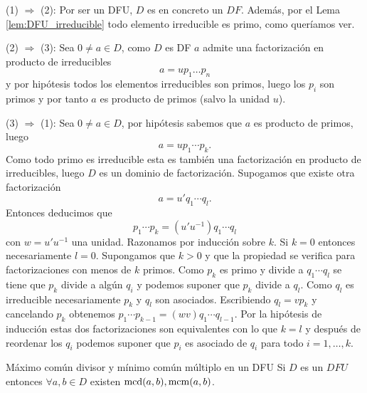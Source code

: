 \begin{proofbox}
(1) $\Rightarrow$ (2): Por ser un DFU, $D$ es en concreto un $DF$. Además, por el Lema \ref{lem:DFU_irreducible} todo elemento irreducible es primo, como queríamos ver.

(2) $\Rightarrow$ (3): Sea $0 \neq a \in D$, como $D$ es DF $a$ admite una factorización en producto de irreducibles
\[
a = u p_1 \dots p_n
\]
y por hipótesis todos los elementos irreducibles son primos, luego los $p_i$ son primos y por tanto $a$ es producto de primos (salvo la unidad $u$).

(3) $\Rightarrow$ (1): Sea $0 \neq a \in D$, por hipótesis sabemos que $a$ es producto de primos, luego
\[
a = u p_1 \cdots p_k.
\]
Como todo primo es irreducible esta es también una factorización en producto de irreducibles, luego $D$ es un dominio de factorización. Supogamos que existe otra factorización
\[
a = u' q_1 \cdots q_l.
\]
Entonces deducimos que 
\[
p_1 \cdots p_k = (u'u^{-1}) q_1 \cdots q_l
\]
con \(w = u'u^{-1}\) una unidad. Razonamos por inducción sobre \(k\). Si \(k = 0\) entonces necesariamente \(l = 0\). Supongamos que \(k > 0\) y que la propiedad se verifica para factorizaciones con menos de \(k\) primos. Como \(p_k\) es primo y divide a \(q_1 \cdots q_l\) se tiene que \(p_k\) divide a algún \(q_i\) y podemos suponer que \(p_k\) divide a \(q_l\). Como \(q_l\) es irreducible necesariamente \(p_k\) y \(q_l\) son asociados. Escribiendo \(q_l = v p_k\) y cancelando \(p_k\) obtenemos \(p_1 \cdots p_{k-1} = (wv) q_1 \cdots q_{l-1}\). Por la hipótesis de inducción estas dos factorizaciones son equivalentes con lo que \(k = l\) y después de reordenar los \(q_i\) podemos suponer que \(p_i\) es asociado de \(q_i\) para todo \(i = 1, \ldots, k\).
\end{proofbox}

\begin{theorem}{Máximo común divisor y mínimo común múltiplo en un DFU}{}
Si $D$ es un $DFU$ entonces $\forall a,b \in D$ existen $\operatorname{mcd}(a,b), \operatorname{mcm}(a,b)$.
\end{theorem}

